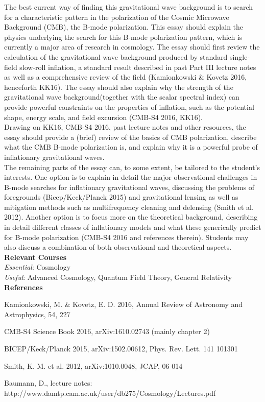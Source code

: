 \documentclass[a4paper,11pt]{article}
\begin{document}
The best current way of finding this gravitational wave background is to search for a characteristic pattern in the polarization of the Cosmic Microwave Background (CMB), the B-mode polarization. This essay should explain the physics underlying the search for this B-mode polarization pattern, which is currently a major area of research in cosmology.
The essay should first review the calculation of the gravitational wave background produced
by standard single-field slow-roll inflation, a standard result described in past Part III lecture notes as well as a comprehensive review of the field (Kamionkowski \& Kovetz 2016, henceforth KK16). The essay should also explain why the strength of the gravitational wave background(together with the scalar spectral index) can provide powerful constraints on the properties of inflation, such as the potential shape, energy scale, and field excursion (CMB-S4 2016, KK16).\\

Drawing on KK16, CMB-S4 2016, past lecture notes and other resources, the essay should provide a (brief) review of the basics of CMB polarization, describe what the CMB B-mode polarization is, and explain why it is a powerful probe of inflationary gravitational waves.\\

The remaining parts of the essay can, to some extent, be tailored to the student’s interests. One option is to explain in detail the major observational challenges in B-mode searches for inflationary gravitational waves, discussing the problems of foregrounds (Bicep/Keck/Planck 2015) and gravitational lensing as well as mitigation methods such as multifrequency cleaning and delensing (Smith et al. 2012). Another option is to focus more on the theoretical background, describing in detail different classes of inflationary models and what these generically predict for B-mode polarization (CMB-S4 2016 and references therein). Students may also discuss a combination of both observational and theoretical aspects.\\

\textbf{Relevant Courses}\\

\textit{Essential}: Cosmology\\

\textit{Useful}: Advanced Cosmology, Quantum Field Theory, General Relativity\\

\textbf{References}
\begin{enumerate}[label={[\arabic*]}]
\item {Kamionkowski, M. \& Kovetz, E. D. 2016, Annual Review of Astronomy and Astrophysics,
54, 227}
\item {CMB-S4 Science Book 2016, arXiv:1610.02743 (mainly chapter 2)}
\item {BICEP/Keck/Planck 2015, arXiv:1502.00612, Phys. Rev. Lett. 141 101301}
\item {Smith, K. M. et al. 2012, arXiv:1010.0048, JCAP, 06 014}
\item {Baumann, D., lecture notes: http://www.damtp.cam.ac.uk/user/db275/Cosmology/Lectures.pdf}
\end{enumerate}
\end{document}
